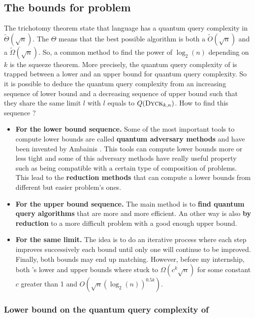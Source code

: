 \subsection{The bounds for  problem}

The trichotomy theorem state that  language has a quantum query complexity
in $\tilde{\Theta}(\sqrt{n})$. The $\Theta$ means that the best possible algorithm
is both a $\tilde{O}(\sqrt{n})$ and a $\tilde{\Omega}(\sqrt{n})$. So, a common method
to find the power of $\log_2(n)$ depending on $k$ is the squeeze theorem. More
precisely, the quantum query complexity of  is trapped between a lower
and an upper bound for quantum query complexity. So it is possible to deduce
the quantum query complexity from an increasing sequence of lower bound and
a decreasing sequence of upper bound such that they share the same limit $l$ with $l$
equals to $Q(\textsc{Dyck$_{k,n}$})$. How to find this sequence ?
\begin{itemize}
    \item \textbf{For the lower bound sequence.} Some of the most important tools to compute
          lower bounds are called \textbf{quantum adversary methods} and have been invented by Ambainis
          \cite{andris_adversary_methode}. This tools can compute
          lower bounds more or less tight and some of this adversary methods have really
          useful property such as being compatible with a certain type of composition
          of problems. This lead to the \textbf{reduction methods} that can compute
          a lower bounds from different but easier problem's ones.
    \item \textbf{For the upper bound sequence.} The main method is to \textbf{find quantum
              query algorithms} that are more and more efficient. An other way is also
          \textbf{by reduction} to a more difficult problem with a
          good enough upper bound.
    \item \textbf{For the same limit.}
          The idea is to do an iterative process where each step improves successively
          each bound until only one will continue to be improved. Finally, both
          bounds may end up matching. However, before my internship, both 's
          lower and upper bounds where stuck to $\Omega\left(c^k\sqrt{n}\right)$ for some
          constant $c$ greater than 1 and $O\left(\sqrt{n}\left(\log_2(n)\right)^{0.5k}\right)$.
\end{itemize}


\subsubsection{Lower bound on the quantum query complexity of }

